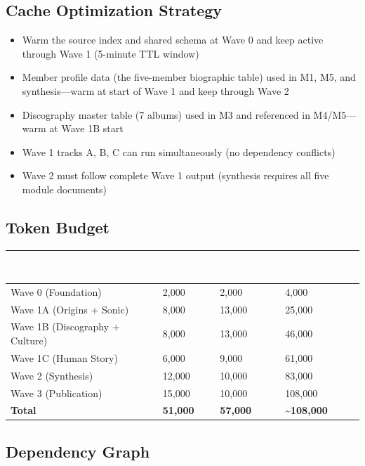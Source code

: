 \documentclass[11pt,letterpaper]{article}
\newcommand{\tableheader}[1]{\textbf{\sffamily\textcolor{white}{#1}}}
\begin{document}
\subsection{Cache Optimization Strategy}

\begin{itemize}[noitemsep]
  \item Warm the source index and shared schema at Wave 0 and keep active through Wave 1 (5-minute TTL window)
  \item Member profile data (the five-member biographic table) used in M1, M5, and synthesis---warm at start of Wave 1 and keep through Wave 2
  \item Discography master table (7 albums) used in M3 and referenced in M4/M5---warm at Wave 1B start
  \item Wave 1 tracks A, B, C can run simultaneously (no dependency conflicts)
  \item Wave 2 must follow complete Wave 1 output (synthesis requires all five module documents)
\end{itemize}

\subsection{Token Budget}

\begin{center}
\begin{tabularx}{\textwidth}{L{4cm}C{2.5cm}C{2.5cm}C{2.5cm}}
\toprule
{}
\tableheader{Wave} & \tableheader{Tokens In} & \tableheader{Tokens Out} & \tableheader{Running Total} \\
\midrule
Wave 0 (Foundation) & 2,000 & 2,000 & 4,000 \\
Wave 1A (Origins + Sonic) & 8,000 & 13,000 & 25,000 \\
Wave 1B (Discography + Culture) & 8,000 & 13,000 & 46,000 \\
Wave 1C (Human Story) & 6,000 & 9,000 & 61,000 \\
Wave 2 (Synthesis) & 12,000 & 10,000 & 83,000 \\
Wave 3 (Publication) & 15,000 & 10,000 & 108,000 \\
\midrule
\textbf{Total} & \textbf{51,000} & \textbf{57,000} & \textbf{\~{}108,000} \\
\bottomrule
\end{tabularx}
\end{center}

\subsection{Dependency Graph}
\end{document}
